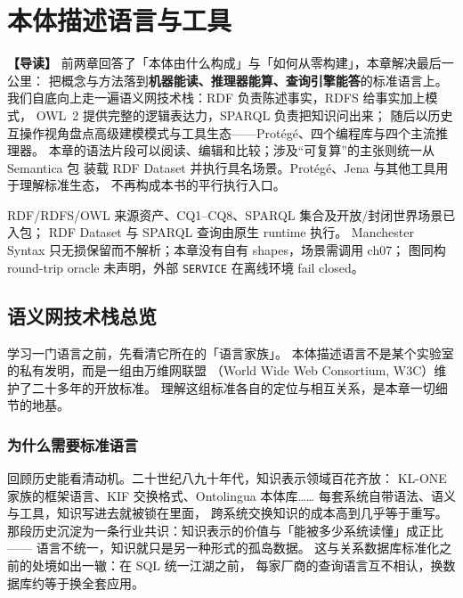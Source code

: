 \chapter{本体描述语言与工具}

\begin{introbox}
\textbf{【导读】}
前两章回答了「本体由什么构成」与「如何从零构建」，本章解决最后一公里：
把概念与方法落到\textbf{机器能读、推理器能算、查询引擎能答}的标准语言上。
我们自底向上走一遍语义网技术栈：RDF 负责陈述事实，RDFS 给事实加上模式，
OWL~2 提供完整的逻辑表达力，SPARQL 负责把知识问出来；
随后以历史互操作视角盘点高级建模模式与工具生态——Protégé、四个编程库与四个主流推理器。
本章的语法片段可以阅读、编辑和比较；涉及“可复算”的主张则统一从 Semantica 包
装载 RDF Dataset 并执行具名场景。Protégé、Jena 与其他工具用于理解标准生态，
不再构成本书的平行执行入口。
\end{introbox}

{RDF/RDFS/OWL 来源资产、CQ1--CQ8、SPARQL 集合及开放/封闭世界场景已入包；
RDF Dataset 与 SPARQL 查询由原生 runtime 执行。}
{Manchester Syntax 只无损保留而不解析；本章没有自有 shapes，场景需调用 ch07；
图同构 round-trip oracle 未声明，外部 \texttt{SERVICE} 在离线环境 fail closed。}

\section{语义网技术栈总览}

学习一门语言之前，先看清它所在的「语言家族」。
本体描述语言不是某个实验室的私有发明，而是一组由万维网联盟
（World Wide Web Consortium, W3C）维护了二十多年的开放标准。
理解这组标准各自的定位与相互关系，是本章一切细节的地基。

\subsection{为什么需要标准语言}

回顾历史能看清动机。二十世纪八九十年代，知识表示领域百花齐放：
KL-ONE 家族的框架语言、KIF 交换格式、Ontolingua 本体库……
每套系统自带语法、语义与工具，知识写进去就被锁在里面，
跨系统交换知识的成本高到几乎等于重写。
那段历史沉淀为一条行业共识：知识表示的价值与「能被多少系统读懂」成正比——
语言不统一，知识就只是另一种形式的孤岛数据。
这与关系数据库标准化之前的处境如出一辙：在 SQL 统一江湖之前，
每家厂商的查询语言互不相认，换数据库约等于换全套应用。


